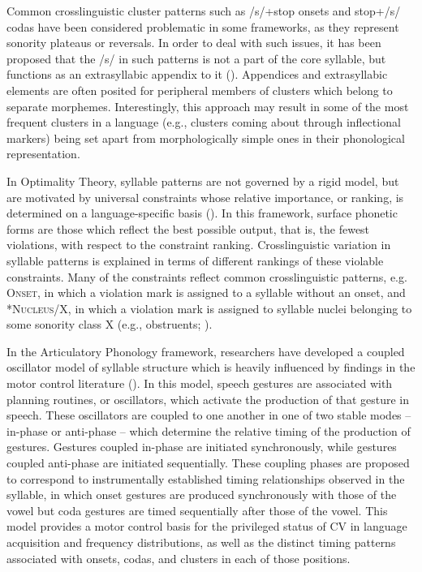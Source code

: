   Common crosslinguistic cluster patterns such as /s/+stop onsets and stop+/s/ codas have been considered problematic in some frameworks, as they represent sonority plateaus or reversals. In order to deal with such issues, it has been proposed that the /s/ in such patterns is not a part of the core syllable, but functions as an extrasyllabic appendix to it (\citealt{VauxWolfe2009,Duanmu2011}). Appendices and extrasyllabic elements are often posited for peripheral members of clusters which belong to separate morphemes. Interestingly, this approach may result in some of the most frequent clusters in a language (e.g., clusters coming about through inflectional markers) being set apart from morphologically simple ones in their phonological representation.

  In Optimality Theory, syllable patterns are not governed by a rigid model, but are motivated by universal constraints whose relative importance, or ranking, is determined on a language-specific basis (\citealt{PrinceSmolensky1993}). In this framework, surface phonetic forms are those which reflect the best possible output, that is, the fewest violations, with respect to the constraint ranking. Crosslinguistic variation in syllable patterns is explained in terms of different rankings of these violable constraints. Many of the constraints reflect common crosslinguistic patterns, e.g. \textsc{Onset}, in which a violation mark is assigned to a syllable without an onset, and *\textsc{Nucleus}/X, in which a violation mark is assigned to syllable nuclei belonging to some sonority class X (e.g., obstruents; \citealt{McCarthy2008}).

  In the Articulatory Phonology framework, researchers have developed a coupled oscillator model of syllable structure which is heavily influenced by findings in the motor control literature (\citealt{NamSaltzman2003,GoldsteinEtAl2006,NamEtAl2009}). In this model, speech gestures are associated with planning routines, or oscillators, which activate the production of that gesture in speech. These oscillators are coupled to one another in one of two stable modes -- in-phase or anti-phase -- which determine the relative timing of the production of gestures. Gestures coupled in-phase are initiated synchronously, while gestures coupled anti-phase are initiated sequentially. These coupling phases are proposed to correspond to instrumentally established timing relationships observed in the syllable, in which onset gestures are produced synchronously with those of the vowel but coda gestures are timed sequentially after those of the vowel. This model provides a motor control basis for the privileged status of CV in language acquisition and frequency distributions, as well as the distinct timing patterns associated with onsets, codas, and clusters in each of those positions.

